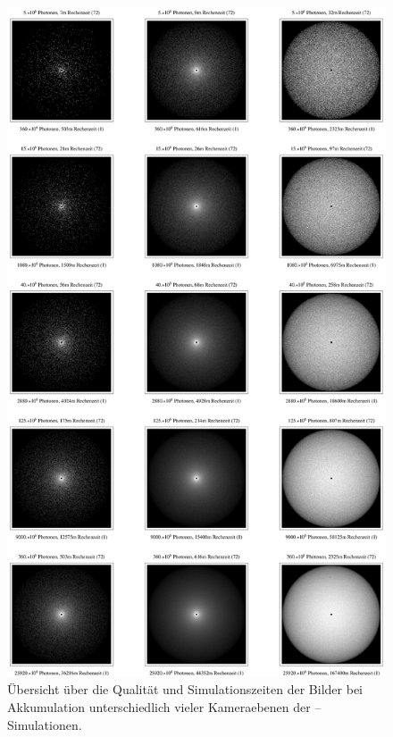 		\begin{figure}
			\centering
			\includegraphics[height=1.0\textheight]{mc3dsphereimageoverview.eps}
			\caption{Übersicht über die Qualität und Simulationszeiten der Bilder bei Akkumulation unterschiedlich vieler Kameraebenen der \mctd--Simulationen.}
			\label{fig:mc3d_sphere_imageoverview}
		\end{figure}
